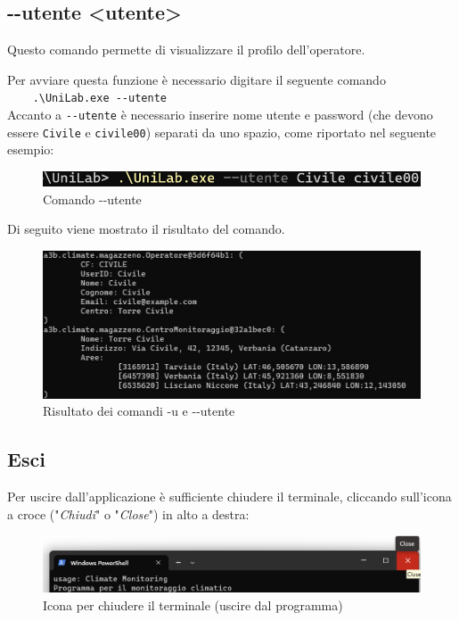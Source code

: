 \documentclass[12pt]{scrreprt}
\begin{document}
		\subsection{-$ $-utente <utente>}
		Questo comando permette di visualizzare il profilo dell'operatore.

		Per avviare questa funzione \`e necessario digitare il seguente comando
		\\\verb!    .\UniLab.exe --utente!\\
		Accanto a \verb!--utente! \`e necessario inserire nome utente e password (che devono essere \verb!Civile! e \verb!civile00!) separati da uno spazio, come riportato nel seguente esempio:
		\begin{figure}[H]
			\centering
			\includegraphics[width=0.6\linewidth]{Screen/utentecom}
			\caption{Comando -$ $-utente}
			\label{fig:utentecom}
		\end{figure}

		Di seguito viene mostrato il risultato del comando.

		\begin{figure}[H]
			\centering
			\includegraphics[width=0.9\linewidth]{Screen/utente}
			\caption{Risultato dei comandi -u e -$ $-utente}
			\label{fig:utente}
		\end{figure}

	\pagebreak
	\subsection{Esci}
	Per uscire dall’applicazione \`e sufficiente chiudere il terminale, cliccando sull’icona a croce ("\textsl{Chiudi}" o "\textsl{Close}") in alto a destra:
	\begin{figure}[H]
		\centering
		\includegraphics[width=0.9\linewidth]{Screen/esci}
		\caption{Icona per chiudere il terminale (uscire dal programma)}
		\label{fig:esci}
	\end{figure}
\end{document}
